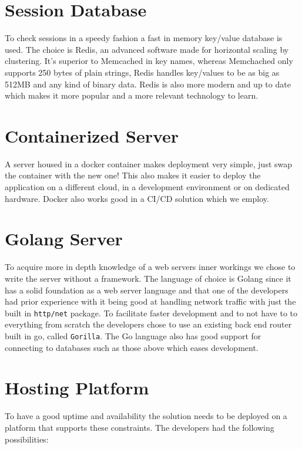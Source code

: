 \documentclass[12pt,a4paper]{report}
\begin{document}
\section{Session Database}
To check sessions in a speedy fashion a fast in memory key/value database is used. The choice is Redis, an advanced software made for horizontal scaling by clustering. It's superior to Memcached in key names, whereas Memchached only supports 250 bytes of plain strings, Redis handles key/values to be as big as 512MB and any kind of binary data. Redis is also more modern and up to date which makes it more popular and a more relevant technology to learn. 

\section{Containerized Server}
A server housed in a docker container makes deployment very simple, just swap the container with the new one! This also makes it easier to deploy the application on a different cloud, in a development environment or on dedicated hardware. Docker also works good in a CI/CD solution which we employ.

\section{Golang Server}
To acquire more in depth knowledge of a web servers inner workings we chose to write the server without a framework. The language of choice is Golang since it has a solid foundation as a web server language and that one of the developers had prior experience with it being good at handling network traffic with just the built in \texttt{http/net} package. To facilitate faster development and to not have to to everything from scratch the developers chose to use an existing back end router built in go, called \texttt{Gorilla}.
The Go language also has good support for connecting to databases such as those above which eases development. 

\section{Hosting Platform}
To have a good uptime and availability the solution needs to be deployed on a platform that supports these constraints. The developers had the following possibilities:
\end{document}
